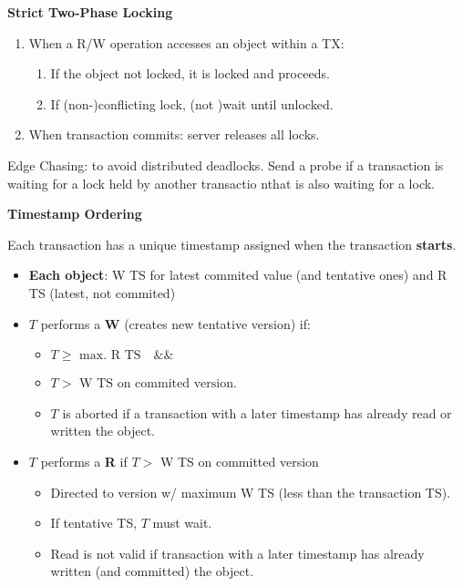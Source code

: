 \documentclass[a4paper, 10pt, twocolumn]{article}
\begin{document}
    \textbf{Strict Two-Phase Locking}
    \begin{enumerate}
        \item When a R/W operation accesses an object within a TX:
        \begin{enumerate}
            \item If the object not locked, it is locked and proceeds.
            \item If (non-)conflicting lock, (not )wait until unlocked.
        \end{enumerate}
        \item When transaction commits: server releases all locks.
    \end{enumerate}
    Edge Chasing: to avoid distributed deadlocks.
    Send a probe if a transaction is waiting for a lock held by another transactio nthat is also waiting for a lock.

    \textbf{Timestamp Ordering}

    Each transaction has a unique timestamp assigned when the transaction \textbf{starts}.
    \begin{itemize}
        \item \textbf{Each object}: W TS for latest commited value (and tentative ones) and R TS (latest, not commited)
        \item $T$ performs a \textbf{W} (creates new tentative version) if:
        \begin{itemize}
            \item $T \geq \text{ max. R TS} \quad \&\& $
            \item $T > \text{ W TS on commited version}$.
            \item $T$ is aborted if a transaction with a later timestamp has already read or written the object.
        \end{itemize}
        \item $T$ performs a \textbf{R} if $T > $ W TS on committed version
        \begin{itemize}
            \item Directed to version w/ maximum W TS (less than the transaction TS).
            \item If tentative TS, $T$ must wait.
            \item Read is not valid if transaction with a later timestamp has already written (and committed) the object.
        \end{itemize}
    \end{itemize}
\end{document}
